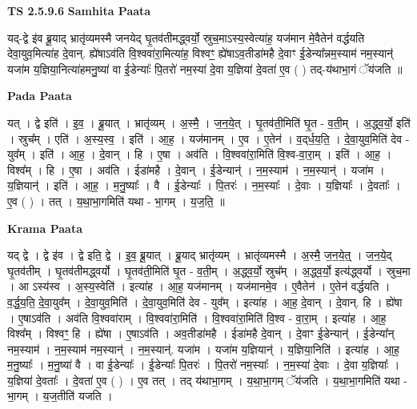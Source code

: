 \documentclass[17pt]{extarticle}
\begin{document}
\textbf{TS 2.5.9.6 } \newline
\textbf{Samhita Paata} \newline

यद्-द्वे इ॑व ब्रू॒याद् भ्रातृ॑व्यमस्मै जनयेद् घृ॒तव॑तीमद्ध्वर्यो॒ स्रुच॒माऽस्य॒स्वेत्या॑ह॒ यज॑मान मे॒वैतेन॑ वर्द्धयति देवा॒युव॒मित्या॑ह दे॒वान्. ह्ये॑षाऽव॑ति वि॒श्ववा॑रा॒मित्या॑ह॒ विश्वꣳ॒॒ ह्ये॑षाऽव॒तीडा॑महै दे॒वाꣳ ई॒डेन्या᳚न्नम॒स्याम॑ नम॒स्यान्॑ यजा॑म य॒ज्ञिया॒नित्या॑हमनु॒ष्या॑ वा ई॒डेन्याः᳚ पि॒तरो॑ नम॒स्या॑ दे॒वा य॒ज्ञिया॑ दे॒वता॑ ए॒व ( ) तद्-य॑थाभा॒गं ॅय॑जति ॥ \newline

\textbf{Pada Paata} \newline

यत् । द्वे इति॑ । इ॒व॒ । ब्रू॒यात् । भ्रातृ॑व्यम् । अ॒स्मै॒ । ज॒न॒ये॒त् । घृ॒तव॑ती॒मिति॑ घृ॒त - व॒ती॒म् । अ॒द्ध्व॒र्यो॒ इति॑ । स्रुच᳚म् । एति॑ । अ॒स्य॒स्व॒ । इति॑ । आ॒ह॒ । यज॑मानम् । ए॒व । ए॒तेन॑ । व॒द्‌र्ध॒य॒ति॒ । दे॒वा॒युव॒मिति॑ देव - युव᳚म् । इति॑ । आ॒ह॒ । दे॒वान् । हि । ए॒षा । अव॑ति । वि॒श्ववा॑रा॒मिति॑ वि॒श्व-वा॒रा॒म् । इति॑ । आ॒ह॒ । विश्व᳚म् । हि । ए॒षा । अव॑ति । ईडा॑महै । दे॒वान् । ई॒डेन्यान्॑ । न॒म॒स्याम॑ । न॒म॒स्यान्॑ । यजा॑म । य॒ज्ञियान्॑ । इति॑ । आ॒ह॒ । म॒नु॒ष्याः᳚ । वै । ई॒डेन्याः᳚ । पि॒तरः॑ । न॒म॒स्याः᳚ । दे॒वाः । य॒ज्ञियाः᳚ । दे॒वताः᳚ । ए॒व ( ) । तत् । य॒था॒भा॒गमिति॑ यथा - भा॒गम् । य॒ज॒ति॒ ॥  \newline


\textbf{Krama Paata} \newline

यद् द्वे । द्वे इ॑व । द्वे इति॒ द्वे । इ॒व॒ ब्रू॒यात् । ब्रू॒याद् भ्रातृ॑व्यम् । भ्रातृ॑व्यमस्मै । अ॒स्मै॒ ज॒न॒ये॒त्॒ । ज॒न॒ये॒द् घृ॒तव॑तीम् । घृ॒तव॑तीमद्ध्वर्यो । घृ॒तव॑ती॒मिति॑ घृ॒त - व॒ती॒म् । अ॒द्ध्व॒र्यो॒ स्रुच᳚म् । अ॒द्ध्व॒र्यो॒ इत्य॑द्ध्वर्यो । स्रुच॒मा । आ ऽस्य॑स्व । अ॒स्य॒स्वेति॑ । इत्या॑ह । आ॒ह॒ यज॑मानम् । यज॑मानमे॒व । ए॒वैतेन॑ । ए॒तेन॑ वर्द्धयति । व॒र्द्ध॒य॒ति॒ दे॒वा॒युव᳚म् । दे॒वा॒युव॒मिति॑ । दे॒वा॒युव॒मिति॑ देव - युव᳚म् । इत्या॑ह । आ॒ह॒ दे॒वान् । दे॒वान्. हि । ह्ये॑षा । ए॒षाऽव॑ति । अव॑ति वि॒श्ववा॑राम् । वि॒श्ववा॑रा॒मिति॑ । वि॒श्ववा॑रा॒मिति॑ वि॒श्व - वा॒रा॒म् । इत्या॑ह । आ॒ह॒ विश्व᳚म् । विश्वꣳ॒॒ हि । ह्ये॑षा । ए॒षाऽव॑ति । अव॒तीडा॑महै । ईडा॑महै दे॒वान् । दे॒वाꣳ ई॒डेन्यान्॑ । ई॒डेन्या᳚न् नम॒स्याम॑ । न॒म॒स्याम॑ नम॒स्यान्॑ । न॒म॒स्यान्॑. यजा॑म । यजा॑म य॒ज्ञियान्॑ । य॒ज्ञिया॒निति॑ । इत्या॑ह । आ॒ह॒ म॒नु॒ष्याः᳚ । म॒नु॒ष्या॑ वै । वा ई॒डेन्याः᳚ । ई॒डेन्याः᳚ पि॒तरः॑ । पि॒तरो॑ नम॒स्याः᳚ । न॒म॒स्या॑ दे॒वाः । दे॒वा य॒ज्ञियाः᳚ । य॒ज्ञिया॑ दे॒वताः᳚ । दे॒वता॑ ए॒व ( ) । ए॒व तत् । तद् य॑थाभा॒गम् । य॒था॒भा॒गम् ॅय॑जति । य॒था॒भा॒गमिति॑ यथा - भा॒गम् । य॒ज॒तीति॑ यजति । \newline
\end{document}
